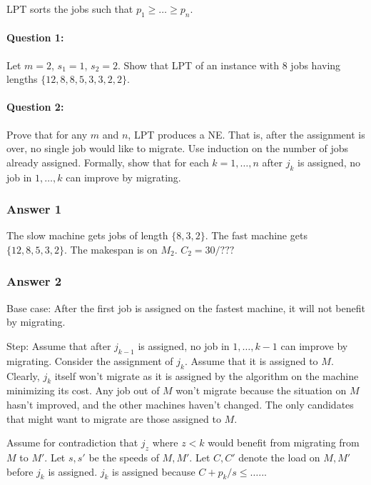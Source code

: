 \documentclass{idc_msc}
\begin{document}
LPT sorts the jobs such that \(p_1 \ge \ldots \ge p_n\).

\paragraph{Question 1:}

Let \(m=2\), \(s_1=1\), \(s_2=2\).
Show that LPT of an instance with 8 jobs having lengths \(\{12, 8, 8, 5, 3, 3, 2, 2\}\).

\paragraph{Question 2:}

Prove that for any \(m\) and \(n\), LPT produces a NE.
That is, after the assignment is over, no single job would like to migrate.
Use induction on the number of jobs already assigned.
Formally, show that for each \(k=1,\ldots,n\) after \(j_k\) is assigned, no job in \(1,\ldots,k\) can improve by migrating.

\subsubsection{Answer 1}

The slow machine gets jobs of length \(\{8,3,2\}\).
The fast machine gets \(\{12,8,5,3,2\}\).
The makespan is on \(M_2\). \(C_2=30/???\)

\subsubsection{Answer 2}

Base case: After the first job is assigned on the fastest machine, it will not benefit by migrating.

Step: Assume that after \(j_{k-1}\) is assigned, no job in \(1,\ldots,k-1\) can improve by migrating.
Consider the assignment of \(j_k\).
Assume that it is assigned to \(M\).
Clearly, \(j_k\) itself won't migrate as it is assigned by the algorithm on the machine minimizing its cost.
Any job out of \(M\) won't migrate because the situation on \(M\) hasn't improved, and the other machines haven't changed.
The only candidates that might want to migrate are those assigned to \(M\).

Assume for contradiction that \(j_z\) where \(z < k\) would benefit from migrating from \(M\) to \(M'\).
Let \(s, s'\) be the speeds of \(M, M'\).
Let \(C, C'\) denote the load on \(M, M'\) before \(j_k\) is assigned.
\(j_k\) is assigned because \(C+p_k/s \le \ldots\)...
\end{document}

